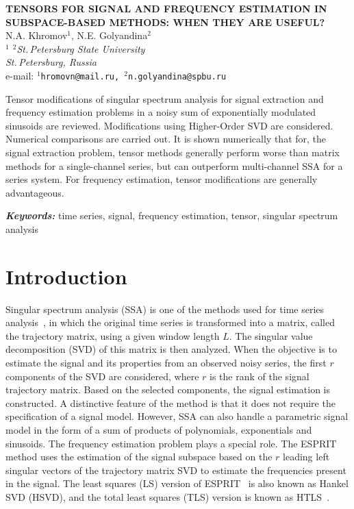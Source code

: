 \documentclass[12pt]{article}
\providecommand{\keywords}[1]
{
  \vspace{2mm}\hspace{20pt}\textbf{\textit{Keywords:}} #1
}
\providecommand{\abskeyw}[2]
{
  \begin{small}
    \begin{adjustwidth}{10mm}{10mm}
      \vspace{1mm}\hspace{20pt}#1

      \keywords{#2}
    \end{adjustwidth}
  \end{small}
}
\theoremstyle{definition}
\begin{document}
\begin{center}
  {\Large\bf TENSORS FOR SIGNAL AND FREQUENCY ESTIMATION IN
  SUBSPACE-BASED METHODS: WHEN THEY ARE USEFUL?}\\\vspace{2mm} {\sc N.A.
  Khromov$^1$, N.E. Golyandina$^2$}\\\vspace{2mm}
  {\it $^{1}$ $^{2}$St.\,Petersburg State University\\
  St.\,Petersburg, Russia\\} e-mail: {\tt $^1$hromovn@mail.ru,
  $^2$n.golyandina@spbu.ru}

  \abskeyw{Tensor modifications of singular spectrum analysis for
    signal extraction and frequency estimation problems in a noisy sum
    of exponentially modulated sinusoids are reviewed. Modifications
    using Higher-Order SVD are considered. Numerical comparisons are
    carried out. It is shown numerically that for, the signal
    extraction problem, tensor methods generally perform worse than
    matrix methods for a single-channel series, but can outperform
    multi-channel SSA for a series system. For frequency estimation,
  tensor modifications are generally advantageous.}{time series,
  signal, frequency estimation, tensor, singular spectrum analysis}
\end{center}

\section{Introduction}

Singular spectrum analysis (SSA) is one of the methods used for time
series analysis~\cite{Golyandina2001}, in which the original time
series is transformed into a matrix, called the trajectory matrix,
using a given window length $L$. The singular value decomposition
(SVD) of this matrix is then analyzed. When the objective is to
estimate the signal and its properties from an observed noisy series,
the first $r$ components of the SVD are considered, where $r$ is the
rank of the signal trajectory matrix. Based on the selected
components, the signal estimation is constructed. A distinctive
feature of the method is that it does not require the specification
of a signal model. However, SSA can also handle a parametric signal
model in the form of a sum of products of polynomials, exponentials
and sinusoids. The frequency estimation problem plays a special role.
The ESPRIT method uses the estimation of the signal subspace based on
the $r$ leading left singular vectors of the trajectory matrix SVD to
estimate the frequencies present in the signal.
The least squares (LS) version of ESPRIT~\cite{Roy1989} is also known
as Hankel SVD (HSVD), and the total least squares (TLS) version is
known as HTLS~\cite{VanHuffel1994}.
\end{document}
